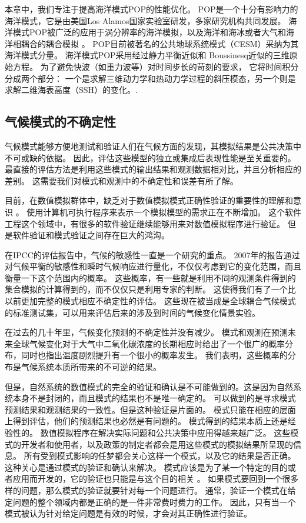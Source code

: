 本章中，我们专注于提高海洋模式POP的性能优化。 
POP是一个十分有影响力的海洋模式，它是由美国Los Alamos国家实验室研发，多家研究机构共同发展。
海洋模式POP被广泛的应用于涡分辨率的海洋模拟\cite{mcclean2002eulerian, stark2004towards}，以及海洋和海冰或者大气和海洋相耦合的耦合模拟  \cite{May2002preliminary}。 
POP目前被著名的公共地球系统模式（CESM）采纳为其海洋模式分量。  
海洋模式POP采用经过静力平衡近似和  Boussinesq近似的三维原始方程。 
为了避免快波（如重力波等）对时间步长的苛刻的要求， 它将时间积分分成两个部分： 一个是求解三维动力学和热动力学过程的斜压模态，另一个则是求解二维海表高度（SSH）的变化。\cite{smith2010parallel}.
 

\subsection{气候模式的不确定性}
气候模式能够方便地测试和验证人们在气候方面的发现，其模拟结果是公共决策中不可或缺的依据。
因此，评估这些模型的独立或集成后表现性能是至关重要的。
最直接的评估方法是利用这些模式的输出结果和观测数据相对比，并且分析相应的差别。 
这需要我们对模式和观测中的不确定性和误差有所了解。 

目前，在数值模拟群体中，缺乏对于数值模拟模式正确性验证的重要性的理解和意识\cite{whitner1989guidelines} 。 
使用计算机可执行程序来表示一个模拟模型的需求正在不断增加。 
这个软件工程这个领域中，有很多的软件验证继续能够用来对数值模拟程序进行验证。
但是软件验证和模式验证之间存在巨大的鸿沟。 

在IPCC的评估报告中，气候的敏感性一直是一个研究的重点\cite{meehl2007global}。
2007年的报告通过对气候平衡的敏感性和瞬时气候响应进行量化，不仅仅考虑到它的变化范围，而且衡量一下这个范围内的概率。
这些概率，有一些就是利用不同的观测条件得到的集合模拟的计算得到的，而不仅仅只是利用专家的判断。 
这使得我们有了一个比以前更加完整的模式相应不确定性的评估。 
这些现在被当成是全球耦合气候模式的标准测试集，可以用来评估后来的涉及到时间的气候变化情景实验。

在过去的几十年里，气候变化预测的不确定性并没有减少\cite{roe2007climate}。 
模式和观测在预测未来全球气候变化对于大气中二氧化碳浓度的长期相应时给出了一个很广的概率分布，同时也指出温度剧烈提升有一个很小的概率发生。
我们表明，这些概率的分布是气候系统本质所带来的不可逆的结果。 

但是，自然系统的数值模式的完全的验证和确认是不可能做到的。这是因为自然系统本身不是封闭的，而且模式的结果也不是唯一确定的\cite{oreskes1994verification}。
可以做到的是寻求模式预测结果和观测结果的一致性。但是这种验证是片面的。
模式只能在相应的层面上得到评估，他们的预测结果也必然是有问题的。
模式得到的结果本质上还是经验性的。
数值模拟程序在解决实际问题和公共决策中应用得越来越广泛。 
这些模式的开发者和使用者，以及政策的制定者都会是用这些模式的模拟结果所呈现的信息。
所有受到模式影响的任梦都会关心这样一个模式，以及它的结果是否正确。
这种关心是通过模式的验证和确认来解决。
模式应该是为了某一个特定的目的或者应用而开发的，它的验证也只能是与这个目的相关\cite{sargent2005verification} 。 
如果模式要回到一个很多样的问题，那么模式的验证就要针对每一个问题进行。
通常，验证一个模式在给定问题的整个领域内都是正确的是一件非常费时费力的工作。 
因此，只有当一个模式被认为针对给定问题是有效的时候，才会对其正确性进行验证。 

